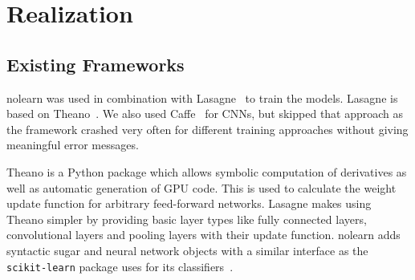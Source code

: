 
\section{Realization}\label{sec:realization}
\subsection{Existing Frameworks}\label{sec:frameworks}
nolearn was used in combination with Lasagne~\cite{sander_dieleman_2015_27878}
to train the models. Lasagne is based on Theano~\cite{Bergstra2010}. We also
used Caffe~\cite{Jia2014} for \glspl{CNN}, but skipped that approach as the
framework crashed very often for different training approaches without giving
meaningful error messages.

Theano is a Python package which allows symbolic computation of derivatives as
well as automatic generation of GPU code. This is used to calculate the weight
update function for arbitrary feed-forward networks. Lasagne makes using Theano
simpler by providing basic layer types like fully connected layers,
convolutional layers and pooling layers with their update function. nolearn
adds syntactic sugar and neural network objects with a similar interface
as the \verb+scikit-learn+ package uses for its classifiers~\cite{scikit-learn}.


